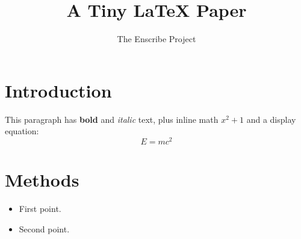 \documentclass{article}
\title{A Tiny LaTeX Paper}
\author{The Enscribe Project}
\begin{document}
\maketitle

\section{Introduction}
This paragraph has \textbf{bold} and \emph{italic} text, plus inline math
$x^2 + 1$ and a display equation:
\[ E = mc^2 \]

\section{Methods}
\begin{itemize}
  \item First point.
  \item Second point.
\end{itemize}
\end{document}
